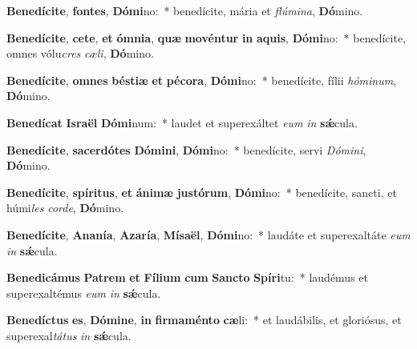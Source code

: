 \item \textbf{Be}\textbf{ne}\textbf{dí}\textbf{ci}\textbf{te}, \textbf{fon}\textbf{tes}, \textbf{Dó}\textbf{mi}no:~* benedícite, mária et \textit{flú}\textit{mi}\textit{na}, \textbf{Dó}mino.
\item \textbf{Be}\textbf{ne}\textbf{dí}\textbf{ci}\textbf{te}, \textbf{ce}\textbf{te}, \textbf{et} \textbf{óm}\textbf{ni}\textbf{a}, \textbf{quæ} \textbf{mo}\textbf{vén}\textbf{tur} \textbf{in} \textbf{a}\textbf{quis}, \textbf{Dó}\textbf{mi}no:~* benedícite, omnes vólu\textit{cres} \textit{cæ}\textit{li}, \textbf{Dó}mino.
\item \textbf{Be}\textbf{ne}\textbf{dí}\textbf{ci}\textbf{te}, \textbf{om}\textbf{nes} \textbf{bés}\textbf{ti}\textbf{æ} \textbf{et} \textbf{pé}\textbf{co}\textbf{ra}, \textbf{Dó}\textbf{mi}no:~* benedícite, fílii \textit{hó}\textit{mi}\textit{num}, \textbf{Dó}mino.
\item \textbf{Be}\textbf{ne}\textbf{dí}\textbf{cat} \textbf{Is}\textbf{ra}\textbf{ël} \textbf{Dó}\textbf{mi}num:~* laudet et superexáltet \textit{e}\textit{um} \textit{in} \textbf{sǽ}cula.
\item \textbf{Be}\textbf{ne}\textbf{dí}\textbf{ci}\textbf{te}, \textbf{sa}\textbf{cer}\textbf{dó}\textbf{tes} \textbf{Dó}\textbf{mi}\textbf{ni}, \textbf{Dó}\textbf{mi}no:~* benedícite, servi \textit{Dó}\textit{mi}\textit{ni}, \textbf{Dó}mino.
\item \textbf{Be}\textbf{ne}\textbf{dí}\textbf{ci}\textbf{te}, \textbf{spí}\textbf{ri}\textbf{tus}, \textbf{et} \textbf{á}\textbf{ni}\textbf{mæ} \textbf{jus}\textbf{tó}\textbf{rum}, \textbf{Dó}\textbf{mi}no:~* benedícite, sancti, et húmi\textit{les} \textit{cor}\textit{de}, \textbf{Dó}mino.
\item \textbf{Be}\textbf{ne}\textbf{dí}\textbf{ci}\textbf{te}, \textbf{A}\textbf{na}\textbf{ní}\textbf{a}, \textbf{A}\textbf{za}\textbf{rí}\textbf{a}, \textbf{Mí}\textbf{sa}\textbf{ël}, \textbf{Dó}\textbf{mi}no:~* laudáte et superexaltáte \textit{e}\textit{um} \textit{in} \textbf{sǽ}cula.
\item \textbf{Be}\textbf{ne}\textbf{di}\textbf{cá}\textbf{mus} \textbf{Pa}\textbf{trem} \textbf{et} \textbf{Fí}\textbf{li}\textbf{um} \textbf{cum} \textbf{Sanc}\textbf{to} \textbf{Spí}\textbf{ri}tu:~* laudémus et superexaltémus \textit{e}\textit{um} \textit{in} \textbf{sǽ}cula.
\item \textbf{Be}\textbf{ne}\textbf{díc}\textbf{tus} \textbf{es}, \textbf{Dó}\textbf{mi}\textbf{ne}, \textbf{in} \textbf{fir}\textbf{ma}\textbf{mén}\textbf{to} \textbf{cæ}li:~* et laudábilis, et gloriósus, et superexal\textit{tá}\textit{tus} \textit{in} \textbf{sǽ}cula.
